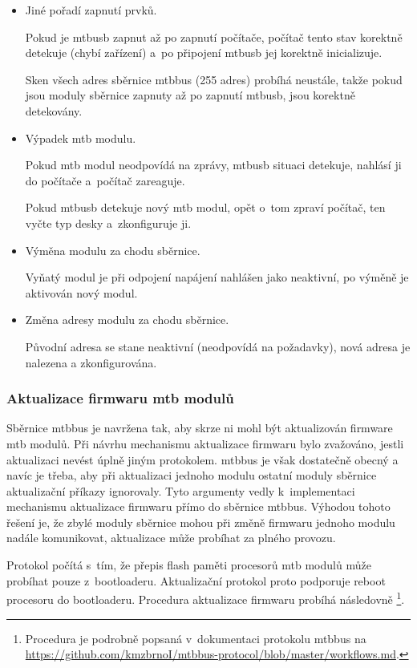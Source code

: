 \begin{itemize}
\item Jiné pořadí zapnutí prvků.

Pokud je \gls{mtbusb} zapnut až po zapnutí počítače, počítač tento stav
korektně detekuje (chybí zařízení) a~po připojení \gls{mtbusb} jej korektně
inicializuje.

Sken všech adres sběrnice \gls{mtbbus} (255 adres) probíhá neustále, takže
pokud jsou moduly sběrnice zapnuty až po zapnutí \gls{mtbusb}, jsou korektně
detekovány.

\item Výpadek \gls{mtb} modulu.

Pokud \gls{mtb} modul neodpovídá na zprávy, \gls{mtbusb} situaci detekuje,
nahlásí ji do počítače a~počítač zareaguje.

Pokud \gls{mtbusb} detekuje nový \gls{mtb} modul, opět o~tom zpraví
počítač, ten vyčte typ desky a~zkonfiguruje ji.

\item Výměna modulu za chodu sběrnice.

Vyňatý modul je při odpojení napájení nahlášen jako neaktivní, po výměně je
aktivován nový modul.

\item Změna adresy modulu za chodu sběrnice.

Původní adresa se stane neaktivní (neodpovídá na požadavky), nová adresa
je nalezena a zkonfigurována.

\end{itemize}


\subsubsection{Aktualizace firmwaru \gls{mtb} modulů} \label{subsub:fw_uprage}

Sběrnice \gls{mtbbus} je navržena tak, aby skrze ni mohl být aktualizován
firmware \gls{mtb} modulů. Při návrhu mechanismu aktualizace firmwaru bylo
zvažováno, jestli aktualizaci nevést úplně jiným protokolem.
\mbox{\gls{mtbbus}} je však dostatečně obecný a navíc je třeba, aby
při aktualizaci jednoho modulu ostatní moduly sběrnice aktualizační příkazy
ignorovaly. Tyto argumenty vedly k~implementaci
mechanismu aktualizace firmwaru přímo do sběrnice \gls{mtbbus}. Výhodou tohoto
řešení je, že zbylé moduly sběrnice mohou při změně firmwaru jednoho
modulu nadále komunikovat, aktualizace může probíhat za plného provozu.

Protokol počítá s~tím, že přepis flash paměti procesorů \gls{mtb} modulů může
probíhat pouze z~bootloaderu. Aktualizační protokol proto podporuje reboot
procesoru do bootloaderu. Procedura aktualizace firmwaru probíhá následovně
\footnote{Procedura je podrobně popsaná v~dokumentaci protokolu
\gls{mtbbus} na \\
\url{https://github.com/kmzbrnoI/mtbbus-protocol/blob/master/workflows.md}.}.

